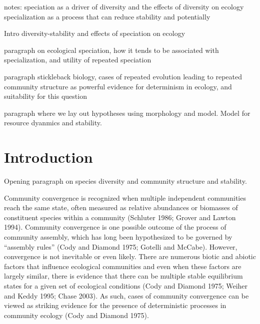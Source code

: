 \documentclass[11pt]{article}
\begin{document}
notes:
speciation as a driver of diversity and the effects of diversity on ecology
specialization as a process that can reduce stability and potentially 


Intro
diversity-stability and effects of speciation on ecology

paragraph on ecological speciation, how it tends to be associated with specialization, and utility of repeated speciation

paragraph stickleback biology, cases of repeated evolution leading to repeated community structure as powerful evidence for determinism in ecology, and suitability for this question

paragraph where we lay out hypotheses using morphology and model. Model for resource dyanmics and stability. 

\newpage{}

\section*{Introduction}


Opening paragraph on species diversity and community structure and stability.

Community convergence is recognized when multiple independent communities reach the same state, often measured as relative abundances or biomasses of constituent species within a community (Schluter 1986; Grover and Lawton 1994).  Community convergence is one possible outcome of the process of community assembly, which has long been hypothesized to be governed by “assembly rules” (Cody and Diamond 1975; Gotelli and McCabe).  However, convergence is not inevitable or even likely.  There are numerous biotic and abiotic factors that influence ecological communities and even when these factors are largely similar, there is evidence that there can be multiple stable equilibrium states for a given set of ecological conditions (Cody and Diamond 1975; Weiher and Keddy 1995; Chase 2003).  As such, cases of community convergence can be viewed as striking evidence for the presence of deterministic processes in community ecology (Cody and Diamond 1975).  
\end{document}
